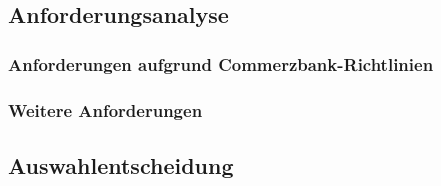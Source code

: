 \subsection{Anforderungsanalyse}
\subsubsection{Anforderungen aufgrund Commerzbank-Richtlinien}

\subsubsection{Weitere Anforderungen}

\subsection{Auswahlentscheidung}